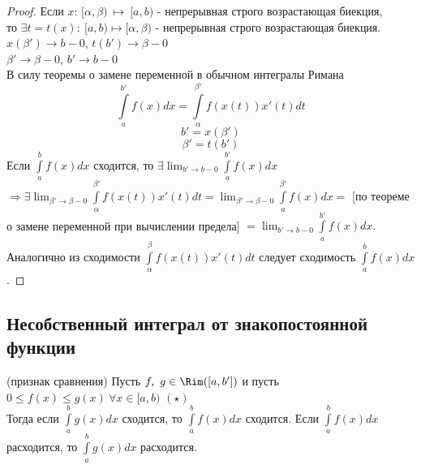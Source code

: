 \begin{proof}
    Если $x$: $[\alpha, \beta) \ \mapsto \ [a, b)$ - непрерывная строго возрастающая биекция, \\ то $\exists t = t(x): \ [a, b) \mapsto [\alpha, \beta)$ - непрерывная строго возрастающая биекция. \\
    $x(\beta') \to b - 0$, $t(b') \to \beta - 0$ \\
    $\beta' \to \beta - 0$, $b' \to b - 0$ \\
    В силу теоремы о замене переменной в обычном интегралы Римана \\
    $$\int \limits_a^{b'} f(x)dx = \int \limits_{\alpha}^{\beta'} f(x(t))x'(t)dt$$
    $$b' = x(\beta')$$
    $$\beta' = t(b')$$
    Если $\int \limits_a^b f(x)dx$ сходится, то $\exists \lim_{b' \to b - 0} \int \limits_a^{b'} f(x) dx$ \\
    $\Longrightarrow \exists \lim_{\beta' \to \beta - 0} \int \limits_{\alpha}^{\beta'} f(x(t))x'(t)dt = \lim_{\beta' \to \beta - 0} \int \limits_a^{\beta'} f(x)dx =$ [по теореме о замене переменной при вычислении предела] $= \lim_{b' \to b - 0} \int \limits_a^{b'} f(x)dx.$ \\
    Аналогично из сходимости $\int \limits_{\alpha}^{\beta} f(x(t))x'(t)dt$ следует сходимость $\int \limits_a^b f(x)dx$.
\end{proof}

\subsection{Несобственный интеграл от знакопостоянной функции}

\begin{theorem} (признак сравнения)
    Пусть $f, \ g \in \Rim([a, b'])$ и пусть $0 \leq f(x) \leq g(x) \ \forall x \in [a, b)$ $(\star)$ \\
    Тогда если $\int \limits_a^b g(x)dx$ сходится, то $\int \limits_a^b f(x) dx$ сходится.
    Если $\int \limits_a^b f(x)dx$ расходится, то $\int \limits_a^b g(x) dx$ расходится.
\end{theorem}

